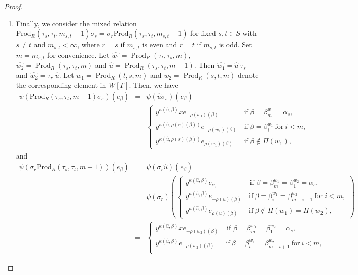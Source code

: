 \documentclass[12pt]{amsart}
\numberwithin{equation}{section}
\begin{document}
\begin{proof}
\begin{enumerate}
\item Finally, we consider the mixed relation $\text{Prod}_{R}(\tau_s,\tau_t,m_{s,t}-1)\sigma_s=\sigma_r\text{Prod}_{R}(\tau_s,\tau_t,m_{s,t}-1)$ for fixed $s,t\in S$ with $s\neq t$ and $m_{s,t} < \infty$, where $r=s $ if $m_{s,t}$ is even and $r=t $ if $m_{s,t}$ is odd. Set $m=m_{s, t}$ for convenience. Let $\widehat{w_1}=\operatorname{Prod}_R\left(\tau_t, \tau_s, m\right)$, $\widehat{w_2}= \operatorname{Prod}_R\left(\tau_s, \tau_t, m\right)$ and $\widehat{u}=\operatorname{Prod}_R\left(\tau_s,\tau_t, m-1\right)$. Then $\widehat{w_1}=\widehat{u}\; \tau_s$ and $\widehat{w_2}=\tau_r \; \widehat{u}$. Let $w_1=\operatorname{Prod}_R\left(t,s, m\right)$ and $w_2=\operatorname{Prod}_R\left(s, t, m\right)$ denote the corresponding element in $W[\Gamma]$. Then, we have
\begin{eqnarray*}
\psi( \text{Prod}_{R}(\tau_s,\tau_t,m-1)\sigma_s)(e_\beta) &=& \psi(\widehat{u}\sigma_s)(e_\beta)\\
&=& \begin{cases} y^{\kappa(\widehat{u}, \beta)} x e_{-\rho(w_1)(\beta)} & ~\text{if}~\beta= \beta_m^{w_1}=\alpha_s,\\
y^{\kappa(\widehat{u}, \rho(s)(\beta))}  e_{-\rho(w_1)(\beta)} &~\text{if}~\beta=\beta_i^{w_1}~\text{for}~i < m,\\
y^{\kappa(\widehat{u}, \rho(s)(\beta))}  e_{\rho(w_1)(\beta)} &~\text{if}~ \beta \not\in \Pi(w_1),
 \end{cases}
\end{eqnarray*}
and
\begin{eqnarray*}
\psi(\sigma_r\text{Prod}_{R}(\tau_s,\tau_t,m-1))(e_\beta) &=& \psi(\sigma_r\widehat{u})(e_\beta)\\
&= & \psi(\sigma_r)\left(\begin{cases}
y^{\kappa(\widehat{u}, \beta)} e_{\alpha_r} & \text{ if } \beta=\beta_m^{w_1}=\beta_1^{w_2}=\alpha_s,\\
y^{\kappa(\widehat{u}, \beta)}  e_{-\rho(u)(\beta)} & ~\text{if}~\beta=\beta_i^{w_1}=\beta_{m-i+1}^{w_2}~\text{for}~i < m,\\
y^{\kappa(\widehat{u}, \beta)}  e_{\rho(u)(\beta)} & ~\text{if}~ \beta \not\in \Pi(w_1)=\Pi(w_2),
\end{cases}\right)\\
&=& \begin{cases}
y^{\kappa(\widehat{u}, \beta)} x e_{-\rho(w_2)(\beta)} & \text{ if } \beta=\beta_m^{w_1}=\beta_1^{w_2}=\alpha_s,\\
y^{\kappa(\widehat{u}, \beta)}  e_{-\rho(w_2)(\beta)} & ~\text{if}~\beta=\beta_i^{w_1}=\beta_{m-i+1}^{w_2}~\text{for}~i < m,\\

\end{cases}
\end{eqnarray*}
\end{enumerate}
\end{proof}
\end{document}
